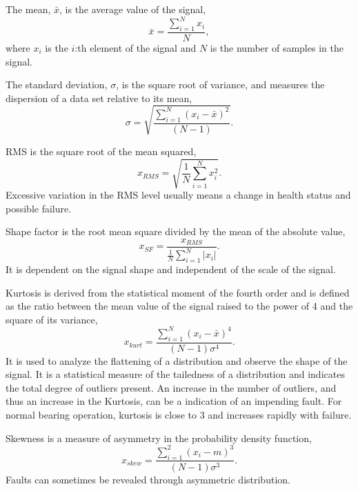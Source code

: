 \documentclass[]{article}
\begin{document}
The mean, $ \bar{x} $, is the average value of the signal,
\begin{equation}
\bar{x} = \frac{\sum^N_{i=1} x_i}{N},
\end{equation}
where $ x_i $ is the $ i $:th element of the signal and $ N $ is the number of samples in the signal.

The standard deviation, $\sigma$, is the square root of variance, and measures the dispersion of a data set relative to its mean,
\begin{equation}
	\sigma = \sqrt{\frac{\sum^N_{i=1}(x_i-\bar{x})^2}{(N-1)}}.
\end{equation}

\gls{RMS} is the square root of the mean squared,
\begin{equation}
x_{RMS} = \sqrt{\frac{1}{N} \sum^N_{i=1}x^2_i}.
\end{equation}
Excessive variation in the \gls{RMS} level usually means a change in health status and possible failure.
 
Shape factor is the root mean square divided by the mean of the absolute value,
\begin{equation}
x_{SF} = \frac{ x_{RMS} }  {\frac{1}{N}\sum^N_{i=1}|x_i|}.
\end{equation}
It is dependent on the signal shape and independent of the scale of the signal.

Kurtosis is derived from the statistical moment of the fourth order and is defined as the ratio between the mean value of the signal raised to the power of 4 and the square of its variance, \begin{equation}
x_{kurt} = \frac{\sum^N_{i=1}(x_i-\bar{x})^4}{(N-1)\sigma^4}.
\end{equation}
It is  used to analyze the flattening of a distribution and observe the shape of the signal. It is a statistical measure of the tailedness of a distribution and indicates the total degree of outliers present. An increase in the number of outliers, and thus an increase in the Kurtosis, can be a indication of an impending fault. For normal bearing operation, kurtosis is close to 3 and increases rapidly with failure.

Skewness is a measure of asymmetry in the probability density function,
\begin{equation}
x_{skew} = \frac{\sum^2_{i=1}(x_i-m)^3}{(N-1)\sigma^3}.
\end{equation}
Faults can sometimes be revealed through asymmetric distribution.
\end{document}
